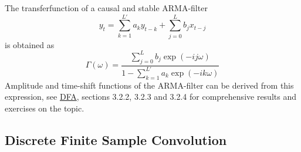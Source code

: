 \documentclass[a4paper]{book}
\begin{document}
The transferfunction of a causal and stable ARMA-filter 
\[y_t=\sum_{k=1}^{L'}a_ky_{t-k}+\sum_{j=0}^{L}b_jx_{t-j}\]
is obtained as
\[\Gamma(\omega)=\frac{\sum_{j=0}^{L}b_j\exp(-ij\omega)}{1-\sum_{k=1}^{L'}a_k\exp(-ik\omega)}\]
Amplitude and time-shift functions of the ARMA-filter can be derived from this expression, see \href{http://blog.zhaw.ch/sef/files/2014/10/DFA.pdf}{DFA}, sections 3.2.2, 3.2.3 and 3.2.4 for comprehensive results and exercises on the topic.





\subsection{Discrete Finite Sample Convolution}
\end{document}
